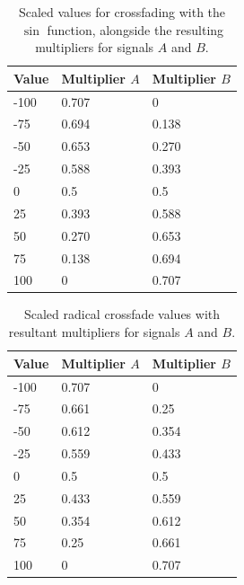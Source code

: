 \begin{table}[h!]

  \centering

  \begin{tabular}[]{| l | l | l |}
    \hline
    \rowcolor[gray]{0.8}
    Value & Multiplier $A$ & Multiplier $B$ \\\hline
    -100 & 0.707 & 0\\\hline
    -75 & 0.694 & 0.138\\\hline
    -50 & 0.653 & 0.270\\\hline
    -25 & 0.588 & 0.393\\\hline
    0 & 0.5 & 0.5\\\hline
    25 & 0.393 & 0.588\\\hline
    50 & 0.270 & 0.653\\\hline
    75 & 0.138 & 0.694\\\hline
    100 & 0 & 0.707\\
    \hline
  \end{tabular}

  \caption{Scaled values for crossfading with the $\sin$ function, alongside the resulting multipliers for signals $A$ and $B$.}

  \label{tb:scrossfadesc}

\end{table}

\begin{table}[ht!]

  \centering

  \begin{tabular}[]{| l | l | l |}
    \hline
    \rowcolor[gray]{0.8}
    Value & Multiplier $A$ & Multiplier $B$ \\\hline
    -100 & 0.707 & 0\\\hline
    -75 & 0.661 & 0.25\\\hline
    -50 & 0.612 & 0.354\\\hline
    -25 & 0.559 & 0.433\\\hline
    0 & 0.5 & 0.5\\\hline
    25 & 0.433 & 0.559\\\hline
    50 & 0.354 & 0.612\\\hline
    75 & 0.25 & 0.661\\\hline
    100 & 0 & 0.707\\
    \hline
  \end{tabular}

  \caption{Scaled radical crossfade values with resultant multipliers for signals $A$ and $B$.}

  \label{tb:sqrtcrossfade}

\end{table}

